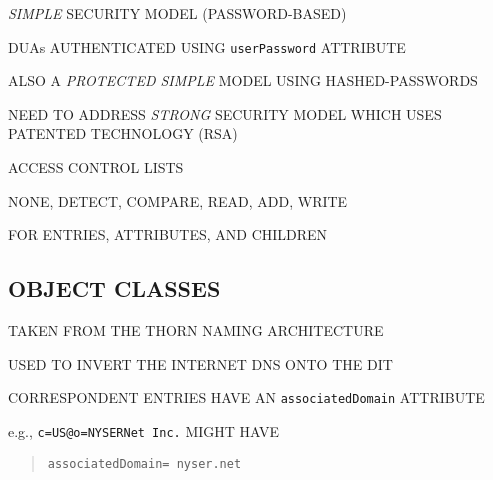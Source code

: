 \begin{bwslide}

\begin{nrtc}
\item	\emph{SIMPLE} SECURITY MODEL (PASSWORD-BASED)
    \begin{nrtc}
    \item	DUAs AUTHENTICATED USING \verb"userPassword" ATTRIBUTE
    \end{nrtc}

\item	ALSO A \emph{PROTECTED SIMPLE} MODEL USING HASHED-PASSWORDS

\item	NEED TO ADDRESS \emph{STRONG} SECURITY MODEL WHICH USES
	PATENTED TECHNOLOGY (RSA)

\item	ACCESS CONTROL LISTS
    \begin{nrtc}
    \item	NONE, DETECT, COMPARE, READ, ADD, WRITE
    \end{nrtc}
    FOR ENTRIES, ATTRIBUTES, AND CHILDREN
\end{nrtc}
\end{bwslide}


\begin{bwslide}
\part*	{OBJECT CLASSES}\bf

\begin{nrtc}
\item	TAKEN FROM THE THORN NAMING ARCHITECTURE
\end{nrtc}
\end{bwslide}


\begin{bwslide}

\begin{nrtc}
\item	USED TO INVERT THE INTERNET DNS ONTO THE DIT

\item	CORRESPONDENT ENTRIES HAVE AN \verb"associatedDomain" ATTRIBUTE

\item	e.g., \verb"c=US@o=NYSERNet Inc." MIGHT HAVE
\begin{quote}\small\begin{verbatim}
associatedDomain= nyser.net
\end{verbatim}\end{quote}
\end{nrtc}
\end{bwslide}



